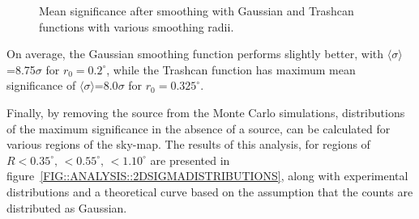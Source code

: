 \begin{figure}[ht]
\centerline{}
\caption{\label{FIG::APPSMOOTHING::SIGMA} Mean significance after smoothing
with Gaussian and Trashcan functions with various smoothing radii.} 
\end{figure}

On average, the Gaussian smoothing function performs slightly better,
with $\langle\sigma\rangle$=8.75$\sigma$ for $r_0=0.2^\circ$, while
the Trashcan function has maximum mean significance of
$\langle\sigma\rangle$=8.0$\sigma$ for $r_0=0.325^\circ$.

Finally, by removing the \Gray source from the Monte Carlo
simulations, distributions of the maximum significance in the absence
of a source, can be calculated for various regions of the sky-map. The
results of this analysis, for regions of $R<0.35^\circ,\,
<0.55^\circ,\, <1.10^\circ$ are presented in
figure~\ref{FIG::ANALYSIS::2DSIGMADISTRIBUTIONS}, along with
experimental distributions and a theoretical curve based on the
assumption that the counts are distributed as Gaussian.
